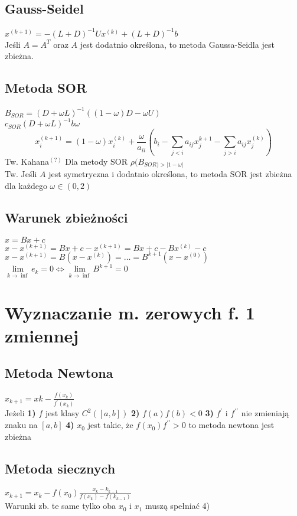 \documentclass[twocolumn]{article}
\begin{document}
\begin{flushleft}
\subsection{Gauss-Seidel}
$x^{(k+1)} = -(L+D)^{-1}Ux^{(k)}+(L+D)^{-1}b$\\
Jeśli $A=A^T$ oraz $A$ jest dodatnio określona, to metoda Gaussa-Seidla jest zbieżna.
\subsection{Metoda SOR}
$B_{SOR} = (D + \omega L)^{-1}((1- \omega)D - \omega U)$\\
$c_{SOR}(D+\omega L)^{-1}b \omega$\\
$$x_i^{(k+1)} = (1 - \omega)x_i^{(k)} + \frac{\omega}{a_{ii}}\left( b_i- \sum_{j<i}a_{ij}x_j^{k+1} - \sum_{j>i}a_{ij}x_j^{(k)} \right)$$
Tw. Kahana$^{(?)}$ Dla metody SOR $\rho(B_{SOR)>|1-\omega|}$\\
Tw. Jeśli $A$ jest symetryczna i dodatnio określona, to metoda SOR jest zbieżna dla każdego $\omega \in (0,2)$
\subsection{Warunek zbieżności}
\thispagestyle{empty} %
$x = Bx + c$\\
$x - x^{(k+1)} = Bx + c - x^{(k+1)} = Bx+c -Bx^{(k)}-c$\\
$x-x^{(k+1)} = B(x-x^{(k)}) = \ldots = B^{k+1}(x-x^{(0)})$\\
$\underset{k \to \inf}{\lim} e_k = 0 \Leftrightarrow \underset{k \to \inf}{\lim} B^{k+1} = 0$
\section{Wyznaczanie m. zerowych f. 1 zmiennej}
\subsection{Metoda Newtona}
$x_{k+1}=x{k}-\frac{f(x_k)}{f^{\prime}(x_k)}$\\
Jeżeli \textbf{1)} $f$ jest klasy $C^2([a,b])$ \textbf{2)} $f(a)f(b)<0$  \textbf{3)} $f^{\prime}$ i $f^{\prime \prime}$ nie zmieniają znaku na $[a,b]$ \textbf{4)} $x_0$ jest takie, że $f(x_0)f^{\prime \prime} > 0$ to metoda newtona jest zbieżna\\
\subsection{Metoda siecznych}
$x_{k+1} = x_k - f(x_0)\frac{x_k-k_{k-1}}{f(x_k)-f(k_{k-1})}$\\
Warunki zb. te same tylko oba $x_0$ i $x_1$ muszą spełniać 4)\\

\end{flushleft}
\end{document}
